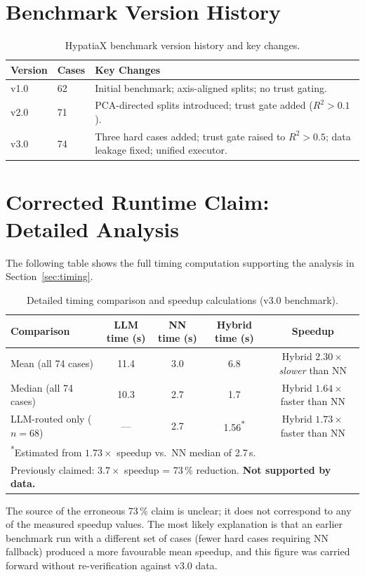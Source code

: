 \documentclass[twoside,11pt]{article}
\newcommand{\Rsq}{R^{2}}
\begin{document}
\section{Benchmark Version History}
\label{app:versions}

\begin{table}[h]
\centering
\caption{HypatiaX benchmark version history and key changes.}
\begin{tabular}{llp{8cm}}
\toprule
Version & Cases & Key Changes \\
\midrule
v1.0 & 62 & Initial benchmark; axis-aligned splits; no trust gating. \\
v2.0 & 71 & PCA-directed splits introduced; trust gate added ($\Rsq > 0.1$). \\
v3.0 & 74 & Three hard cases added; trust gate raised to $\Rsq > 0.5$; data leakage fixed; unified executor. \\
\bottomrule
\end{tabular}
\end{table}

\section{Corrected Runtime Claim: Detailed Analysis}
\label{app:timing}

The following table shows the full timing computation supporting the analysis
in Section~\ref{sec:timing}.

\begin{table}[h]
\centering
\caption{Detailed timing comparison and speedup calculations (v3.0 benchmark).}
\begin{tabular}{lcccc}
\toprule
Comparison & LLM time (s) & NN time (s) & Hybrid time (s) & Speedup \\
\midrule
Mean (all 74 cases)        & 11.4 & 3.0 & 6.8 & Hybrid $2.30\times$ \emph{slower} than NN \\
Median (all 74 cases)      & 10.3 & 2.7 & 1.7 & Hybrid $1.64\times$ faster than NN \\
LLM-routed only ($n=68$)   & ---  & 2.7 & 1.56\textsuperscript{*} & Hybrid $1.73\times$ faster than NN \\
\midrule
\multicolumn{5}{l}{\textsuperscript{*}Estimated from $1.73\times$ speedup vs.\ NN median of 2.7\,s.} \\
\multicolumn{5}{l}{Previously claimed: $3.7\times$ speedup = 73\,\% reduction. \textbf{Not supported by data.}} \\
\bottomrule
\end{tabular}
\end{table}

\noindent
The source of the erroneous 73\,\% claim is unclear; it does not correspond to
any of the measured speedup values.  The most likely explanation is that an
earlier benchmark run with a different set of cases (fewer hard cases requiring
NN fallback) produced a more favourable mean speedup, and this figure was
carried forward without re-verification against v3.0 data.
\end{document}
